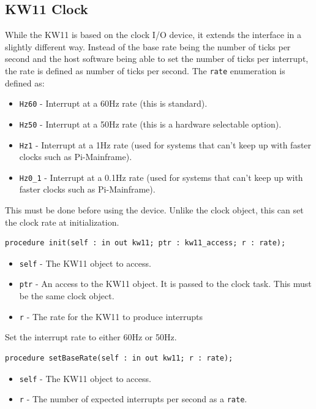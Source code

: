 \documentclass[10pt, openany]{book}
\newcommand{\keyword}[1]{\texttt{#1}}
\newcommand{\datatype}[1]{\texttt{#1}}
\begin{document}
\subsection{KW11 Clock}
While the KW11 is based on the clock I/O device, it extends the interface in a slightly different way.
Instead of the base rate being the number of ticks per second and the host software being able to set the number of ticks per interrupt, the rate is defined as number of ticks per second.
The \datatype{rate} enumeration is defined as:
\begin{itemize}
  \item \keyword{Hz60} - Interrupt at a 60Hz rate (this is standard).
  \item \keyword{Hz50} - Interrupt at a 50Hz rate (this is a hardware selectable option).
  \item \keyword{Hz1} - Interrupt at a 1Hz rate (used for systems that can't keep up with faster clocks such as Pi-Mainframe).
  \item \keyword{Hz0\_1} - Interrupt at a 0.1Hz rate (used for systems that can't keep up with faster clocks such as Pi-Mainframe).
\end{itemize}

This must be done before using the device.
Unlike the clock object, this can set the clock rate at initialization.
\begin{lstlisting}
procedure init(self : in out kw11; ptr : kw11_access; r : rate);
\end{lstlisting}
\begin{itemize}
  \item \keyword{self} - The KW11 object to access.
  \item \keyword{ptr} - An access to the KW11 object.  It is passed to the clock task.  This must be the same clock object.
  \item \keyword{r} - The rate for the KW11 to produce interrupts
\end{itemize}

Set the interrupt rate to either 60Hz or 50Hz.
\begin{lstlisting}
procedure setBaseRate(self : in out kw11; r : rate);
\end{lstlisting}
\begin{itemize}
  \item \keyword{self} - The KW11 object to access.
  \item \keyword{r} - The number of expected interrupts per second as a \datatype{rate}.
\end{itemize}
\end{document}

